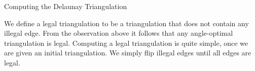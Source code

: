 \begin{frame}{Computing the Delaunay Triangulation}

We define a legal triangulation to be a triangulation that does not contain
any illegal edge. From the observation above it follows that any angle-optimal
triangulation is legal. Computing a legal triangulation is quite simple, once we
are given an initial triangulation. We simply flip illegal edges until all edges are
legal.

\begin{algorithm}[H]
\SetAlgoLined
{}
\end{algorithm}
\end{frame}

